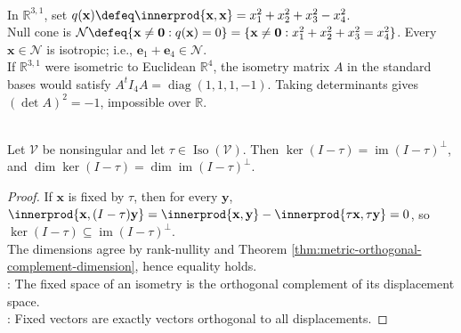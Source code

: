\begin{example} \label{ex:minkowski-null-cone-and-inertia} \\
In $\mathbb{R}^{3,1}$, set $q(\mathbf{x})\defeq\innerprod{\mathbf{x},\mathbf{x}} =x_1^2+x_2^2+x_3^2-x_4^2$.\\
Null cone is $\mathcal{N}\defeq\{\mathbf{x}\neq\mathbf{0}:q(\mathbf{x})=0\} =\{\mathbf{x}\neq\mathbf{0}:x_1^2+x_2^2+x_3^2=x_4^2\}$. Every $\mathbf{x}\in\mathcal{N}$ is isotropic; i.e., $\mathbf{e}_1+\mathbf{e}_4\in\mathcal{N}$.\\
If $\mathbb{R}^{3,1}$ were isometric to Euclidean $\mathbb{R}^4$, the isometry matrix $A$ in the standard bases would satisfy $A^tI_4A=\operatorname{diag}(1,1,1,-1)$. Taking determinants gives $(\det A)^2=-1$, impossible over $\mathbb{R}$.
\end{example}

\begin{proposition} \label{prop:isometry-fixed-space} \\
Let $\mathcal{V}$ be nonsingular and let $\tau\in\operatorname{Iso}(\mathcal{V})$. Then $\ker(I-\tau)=\operatorname{im}(I-\tau)^{\perp}$, and $\dim\ker(I-\tau)=\dim\operatorname{im}(I-\tau)^{\perp}$.
\begin{proof}
If $\mathbf{x}$ is fixed by $\tau$, then for every $\mathbf{y}$, $\innerprod{\mathbf{x},(I-\tau)\mathbf{y}} =\innerprod{\mathbf{x},\mathbf{y}}-\innerprod{\tau\mathbf{x},\tau\mathbf{y}}=0$, so $\ker(I-\tau)\subseteq\operatorname{im}(I-\tau)^{\perp}$.\\
The dimensions agree by rank-nullity and Theorem \ref{thm:metric-orthogonal-complement-dimension}, hence equality holds.\\
: The fixed space of an isometry is the orthogonal complement of its displacement space.\\
: Fixed vectors are exactly vectors orthogonal to all displacements.
\end{proof}
\end{proposition}

